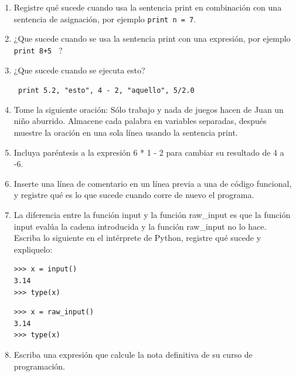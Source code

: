 \begin{enumerate}

\item Registre qué sucede cuando usa la sentencia print en combinación con una 
sentencia de asignación, por ejemplo \verb+print n = 7+.

\item ¿Que sucede cuando se usa la sentencia print con una expresión,  por ejemplo
\verb# print 8+5 #  ?

\item ¿Que sucede cuando se ejecuta esto? 

\verb+ print 5.2, "esto", 4 - 2, "aquello", 5/2.0 +

\item Tome la siguiente oración: Sólo trabajo y nada de juegos hacen de Juan un 
niño aburrido. Almacene cada palabra en variables separadas, después muestre la oración 
en una sola línea usando la sentencia print.

\item Incluya paréntesis a la expresión 6 * 1 - 2 para cambiar su resultado de 4 a -6.

\item Inserte una línea de comentario en un línea previa a una de código funcional, y 
registre qué es lo que sucede cuando corre de nuevo el programa.

\item La diferencia entre la función input y la función raw\_input es que la función 
input evalúa la cadena introducida y la función raw\_input no lo hace. Escriba lo siguiente 
en el intérprete de Python, registre qué sucede y expliquelo:

\begin{verbatim}
>>> x = input()
3.14
>>> type(x)
\end{verbatim}

\begin{verbatim}
>>> x = raw_input()
3.14
>>> type(x)
\end{verbatim}

\item Escriba una expresión que calcule la nota definitiva de su curso de programación.

\end{enumerate}
